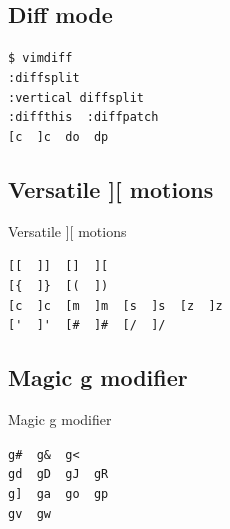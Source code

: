 \documentclass[14pt,svgnames,compress]{beamer}
\newcommand\hl[1]{\textcolor{HlColor}{#1}}
\newcommand\framesubtitlefontsize{\huge}
\newcommand\singleframesubtitle[1]{
    \begin{center}
        \framesubtitlefontsize #1
    \end{center}
}
\newcommand\subtitleframe{
    \begin{frame}
        \singleframesubtitle{\insertsubsectionhead}
    \end{frame}
}
\begin{document}
\subsection{Diff mode}

\subtitleframe

\begin{frame}[fragile]
    \begin{spacing}{1.5} %
        \large
        \centering
        \verb|$ vimdiff| \\
        \verb|:diffsplit| \\
        \verb|:vertical diffsplit| \\
        \verb|:diffthis  :diffpatch| \\  \vspace{1cm}
        \verb|[c  ]c  do  dp| \\
    \end{spacing}
\end{frame}


\subsection{Versatile ][ motions}

\begin{frame}
    \singleframesubtitle{Versatile \hl{][} motions}
\end{frame}

\begin{frame}[fragile]
    \begin{spacing}{1.5} %
        \Large
        \centering
        \verb|[[  ]]  []  ][| \\ \bigskip
        \verb|[{  ]}  [(  ])| \\ \bigskip
        \verb|[c  ]c  [m  ]m  [s  ]s  [z  ]z| \\ \bigskip
        \verb|['  ]'  [#  ]#  [/  ]/| \\ \bigskip
    \end{spacing}
\end{frame}


\subsection{Magic g modifier}

\begin{frame}
    \singleframesubtitle{Magic \hl{g} modifier}
\end{frame}

\begin{frame}[fragile]
    \begin{spacing}{1.5} %
        \Large
        \centering
        \verb|g#  g&  g<| \\ \medskip
        \verb|gd  gD  gJ  gR| \\ \medskip
        \verb|g]  ga  go  gp| \\ \medskip
        \verb|gv  gw| \\
    \end{spacing}
\end{frame}
\end{document}
